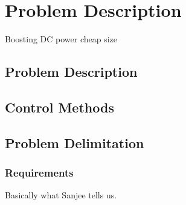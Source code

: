 \chapter{Problem Description}\label{ch:probdesc}
Boosting DC power
cheap
size


\section{Problem Description}


\section{Control Methods}


\section{Problem Delimitation}

\subsection{Requirements}\label{sub:req}
Basically what Sanjee tells us.